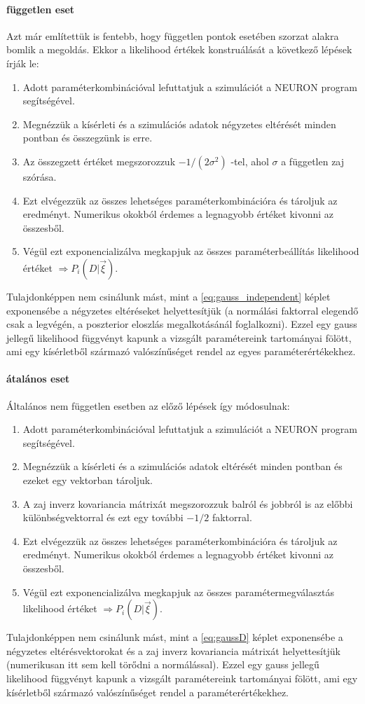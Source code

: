  \paragraph{független eset}
Azt már említettük is fentebb, hogy független pontok esetében szorzat alakra bomlik a megoldás. Ekkor a likelihood értékek konstruálását a következő lépések írják le:
\begin{enumerate}\label{meth:independet}
	\item Adott paraméterkombinációval lefuttatjuk a szimulációt a NEURON program segítségével.
	\item Megnézzük a kísérleti és a szimulációs adatok négyzetes eltérését minden pontban és összegzünk is erre.
	\item Az összegzett értéket megszorozzuk $-1/(2 \sigma^2)$ -tel, ahol $\sigma$ a független zaj szórása.
	\item Ezt elvégezzük az összes lehetséges paraméterkombinációra és tároljuk az eredményt. Numerikus okokból érdemes a legnagyobb értéket kivonni az összesből.
	\item Végül ezt exponencializálva megkapjuk az összes paraméterbeállítás likelihood értéket $\Rightarrow P_i(D|\vec{\xi})$.
\end{enumerate}
Tulajdonképpen nem csinálunk mást, mint a \ref{eq:gauss_independent} képlet exponensébe a négyzetes eltéréseket helyettesítjük (a normálási faktorral elegendő csak a legvégén, a poszterior eloszlás megalkotásánál foglalkozni). Ezzel egy gauss jellegű likelihood függvényt kapunk a vizsgált paramétereink tartományai fölött, ami egy kísérletből származó valószínűséget rendel az egyes paraméterértékekhez.

\paragraph{átalános eset}
Általános nem független esetben az előző lépések így módosulnak:
\begin{enumerate}\label{meth:dependet}
	\item Adott paraméterkombinációval lefuttatjuk a szimulációt a NEURON program segítségével.
	\item Megnézzük a kísérleti és a szimulációs adatok eltérését minden pontban és ezeket egy vektorban tároljuk.
	\item A zaj inverz kovariancia mátrixát megszorozzuk balról és jobbról is az előbbi különbségvektorral és ezt egy további $-1/2$ faktorral.
	\item Ezt elvégezzük az összes lehetséges paraméterkombinációra és tároljuk az eredményt. Numerikus okokból érdemes a legnagyobb értéket kivonni az összesből.
	\item Végül ezt exponencializálva megkapjuk az összes paramétermegválasztás likelihood értéket $\Rightarrow P_i(D|\vec{\xi})$.
\end{enumerate}
Tulajdonképpen nem csinálunk mást, mint a \ref{eq:gaussD} képlet exponensébe a négyzetes eltérésvektorokat és a zaj inverz kovariancia mátrixát helyettesítjük (numerikusan itt sem kell törődni a normálással). Ezzel egy gauss jellegű likelihood függvényt kapunk a vizsgált paramétereink tartományai fölött, ami egy kísérletből származó valószínűséget rendel a paraméterértékekhez.

